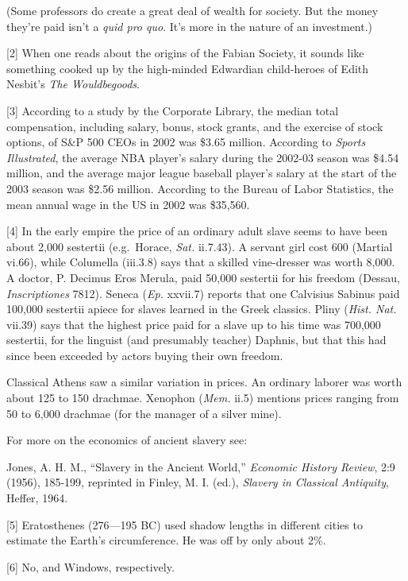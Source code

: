 (Some professors do create a great deal of wealth for society. But the
money they're paid isn't a \emph{quid pro quo}. It's more in the nature
of an investment.)

{[}2{]} When one reads about the origins of the Fabian Society, it
sounds like something cooked up by the high-minded Edwardian
child-heroes of Edith Nesbit's \emph{The Wouldbegoods}.

{[}3{]} According to a study by the Corporate Library, the median total
compensation, including salary, bonus, stock grants, and the exercise of
stock options, of S\&P 500 CEOs in 2002 was \$3.65 million. According to
\emph{Sports Illustrated}, the average NBA player's salary during the
2002-03 season was \$4.54 million, and the average major league baseball
player's salary at the start of the 2003 season was \$2.56 million.
According to the Bureau of Labor Statistics, the mean annual wage in the
US in 2002 was \$35,560.

{[}4{]} In the early empire the price of an ordinary adult slave seems
to have been about 2,000 sestertii (e.g.~Horace, \emph{Sat.} ii.7.43). A
servant girl cost 600 (Martial vi.66), while Columella (iii.3.8) says
that a skilled vine-dresser was worth 8,000. A doctor, P. Decimus Eros
Merula, paid 50,000 sestertii for his freedom (Dessau,
\emph{Inscriptiones} 7812). Seneca (\emph{Ep.} xxvii.7) reports that one
Calvisius Sabinus paid 100,000 sestertii apiece for slaves learned in
the Greek classics. Pliny (\emph{Hist. Nat.} vii.39) says that the
highest price paid for a slave up to his time was 700,000 sestertii, for
the linguist (and presumably teacher) Daphnis, but that this had since
been exceeded by actors buying their own freedom.

Classical Athens saw a similar variation in prices. An ordinary laborer
was worth about 125 to 150 drachmae. Xenophon (\emph{Mem.} ii.5)
mentions prices ranging from 50 to 6,000 drachmae (for the manager of a
silver mine).

For more on the economics of ancient slavery see:

Jones, A. H. M., ``Slavery in the Ancient World,'' \emph{Economic
History Review}, 2:9 (1956), 185-199, reprinted in Finley, M. I. (ed.),
\emph{Slavery in Classical Antiquity}, Heffer, 1964.

{[}5{]} Eratosthenes (276---195 BC) used shadow lengths in different
cities to estimate the Earth's circumference. He was off by only about
2\%.

{[}6{]} No, and Windows, respectively.

